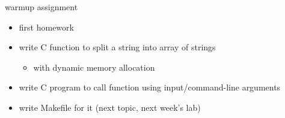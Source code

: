 \begin{frame}{warmup assignment}
\begin{itemize}
\item first homework
\vspace{.5cm}
\item write C function to split a string into array of strings
    \begin{itemize}
    \item with dynamic memory allocation
    \end{itemize}
\item write C program to call function using input/command-line arguments
\item write Makefile for it (next topic, next week's lab)
\end{itemize}
\end{frame}
